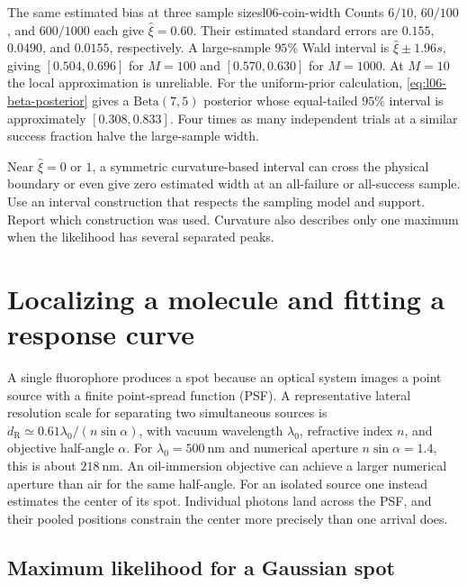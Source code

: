 \begin{example}{The same estimated bias at three sample sizes}{l06-coin-width}
Counts $6/10$, $60/100$, and $600/1000$ each give $\widehat\xi=0.60$. Their estimated standard errors are $0.155$, $0.0490$, and $0.0155$, respectively. A large-sample $95\%$ Wald interval is $\widehat\xi\pm1.96s$, giving $[0.504,0.696]$ for $M=100$ and $[0.570,0.630]$ for $M=1000$. At $M=10$ the local approximation is unreliable. For the uniform-prior calculation, \eqref{eq:l06-beta-posterior} gives a $\mathrm{Beta}(7,5)$ posterior whose equal-tailed $95\%$ interval is approximately $[0.308,0.833]$. Four times as many independent trials at a similar success fraction halve the large-sample width.
\end{example}

\begin{remark}
Near $\widehat\xi=0$ or $1$, a symmetric curvature-based interval can cross the physical boundary or even give zero estimated width at an all-failure or all-success sample. Use an interval construction that respects the sampling model and support. Report which construction was used. Curvature also describes only one maximum when the likelihood has several separated peaks.
\end{remark}

\section{Localizing a molecule and fitting a response curve}
\label{sec:l06-localization}

A single fluorophore produces a spot because an optical system images a point source with a finite point-spread function (PSF). A representative lateral resolution scale for separating two simultaneous sources is $d_{\mathrm{R}}\simeq0.61\lambda_0/(n\sin\alpha)$, with vacuum wavelength $\lambda_0$, refractive index $n$, and objective half-angle $\alpha$. For $\lambda_0=\SI{500}{\nano\metre}$ and numerical aperture $n\sin\alpha=1.4$, this is about $\SI{218}{\nano\metre}$. An oil-immersion objective can achieve a larger numerical aperture than air for the same half-angle. For an isolated source one instead estimates the center of its spot. Individual photons land across the PSF, and their pooled positions constrain the center more precisely than one arrival does.

\subsection{Maximum likelihood for a Gaussian spot}
\label{subsec:l06-gaussian}

